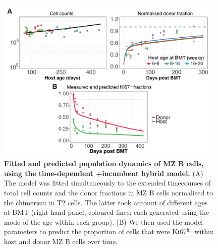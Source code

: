 \documentclass[11pt]{article}
\newcommand{\khi}{Ki67$^\text{hi}$}
\begin{document}
\begin{figure}[h!]
	\centerline{\includegraphics[scale = 0.85] {TDM_INC_MZ.pdf}}
	\caption{\small \textbf{Fitted and predicted population dynamics of MZ B cells, using the time-dependent +incumbent hybrid model.}  (A) The model was fitted simultaneously to the extended timecourses of total cell counts and the donor fractions in MZ B cells normalised to the chimerism in T2 cells. The latter took account of different ages at BMT (right-hand panel, coloured lines; each generated using the  mode of the age within each group). (B) We then used the model parameters to predict the proportion of cells that were \khi\ within host and donor MZ B cells over time.}
	\label{fig:TDM_INC_MZ}
\end{figure}
\end{document}
